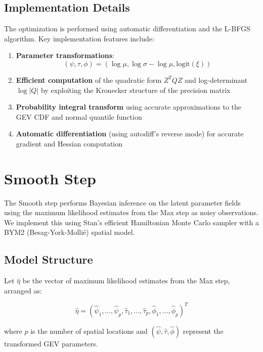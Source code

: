 \documentclass[
  letterpaper,
  DIV=11,
  numbers=noendperiod]{scrartcl}
\begin{document}
\subsection{Implementation Details}\label{implementation-details}

The optimization is performed using automatic differentiation and the
L-BFGS algorithm. Key implementation features include:

\begin{enumerate}
\def\labelenumi{\arabic{enumi}.}
\item
  \textbf{Parameter transformations}:
  \[(\psi,\tau,\phi) = (\log\mu, \log\sigma-\log\mu, \text{logit}(\xi))\]
\item
  \textbf{Efficient computation} of the quadratic form \(Z^TQZ\) and
  log-determinant \(\log|Q|\) by exploiting the Kronecker structure of
  the precision matrix
\item
  \textbf{Probability integral transform} using accurate approximations
  to the GEV CDF and normal quantile function
\item
  \textbf{Automatic differentiation} (using autodiff's reverse mode) for
  accurate gradient and Hessian computation
\end{enumerate}

\section{Smooth Step}\label{smooth-step}

The Smooth step performs Bayesian inference on the latent parameter
fields using the maximum likelihood estimates from the Max step as noisy
observations. We implement this using Stan's efficient Hamiltonian Monte
Carlo sampler with a BYM2 (Besag-York-Mollié) spatial model.

\subsection{Model Structure}\label{model-structure}

Let \(\hat{\eta}\) be the vector of maximum likelihood estimates from
the Max step, arranged as:

\[\hat{\eta} = (\hat{\psi}_1,\ldots,\hat{\psi}_p, \hat{\tau}_1,\ldots,\hat{\tau}_p, \hat{\phi}_1,\ldots,\hat{\phi}_p)^T\]

where \(p\) is the number of spatial locations and
\((\hat{\psi}, \hat{\tau}, \hat{\phi})\) represent the transformed GEV
parameters.
\end{document}
